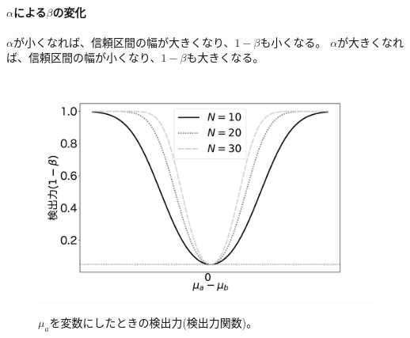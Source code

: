 \paragraph{$\alpha$による$\beta$の変化}
$\alpha$が小くなれば、信頼区間の幅が大きくなり、$1-\beta$も小くなる。
$\alpha$が大きくなれば、信頼区間の幅が小くなり、$1-\beta$も大きくなる。



\begin{figure}
    \begin{center}
        \includegraphics[width=15cm]{./image/04_/power_of_test.pdf}
        \label{fig:power_of_test_N_mu0_variable}
        \caption{$\mu_a$を変数にしたときの検出力(検出力関数)。}
    \end{center}
\end{figure}

